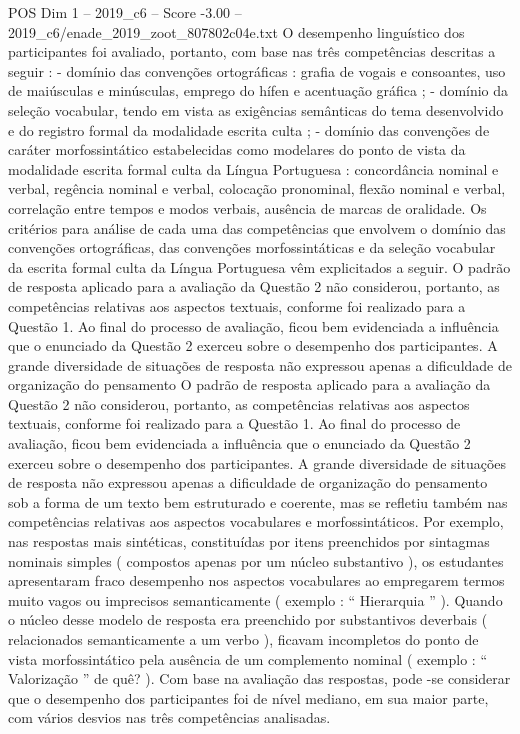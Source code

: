 \begin{textsample}{POS Dim 1 – 2019\_c6 – Score -3.00 – 2019\_c6/enade\_2019\_zoot\_807802c04e.txt}
O desempenho linguístico dos participantes foi avaliado, portanto, com base nas três competências descritas a seguir : - domínio das convenções ortográficas : grafia de vogais e consoantes, uso de maiúsculas e minúsculas, emprego do hífen e acentuação gráfica ; - domínio da seleção vocabular, tendo em vista as exigências semânticas do tema desenvolvido e do registro formal da modalidade escrita culta ; - domínio das convenções de caráter morfossintático estabelecidas como modelares do ponto de vista da modalidade escrita formal culta da Língua Portuguesa : concordância nominal e verbal, regência nominal e verbal, colocação pronominal, flexão nominal e verbal, correlação entre tempos e modos verbais, ausência de marcas de oralidade.
Os critérios para análise de cada uma das competências que envolvem o domínio das convenções ortográficas, das convenções morfossintáticas e da seleção vocabular da escrita formal culta da Língua Portuguesa vêm explicitados a seguir.
O padrão de resposta aplicado para a avaliação da Questão 2 não considerou, portanto, as competências relativas aos aspectos textuais, conforme foi realizado para a Questão 1.
Ao final do processo de avaliação, ficou bem evidenciada a influência que o enunciado da Questão 2 exerceu sobre o desempenho dos participantes.
A grande diversidade de situações de resposta não expressou apenas a dificuldade de organização do pensamento O padrão de resposta aplicado para a avaliação da Questão 2 não considerou, portanto, as competências relativas aos aspectos textuais, conforme foi realizado para a Questão 1.
Ao final do processo de avaliação, ficou bem evidenciada a influência que o enunciado da Questão 2 exerceu sobre o desempenho dos participantes.
A grande diversidade de situações de resposta não expressou apenas a dificuldade de organização do pensamento sob a forma de um texto bem estruturado e coerente, mas se refletiu também nas competências relativas aos aspectos vocabulares e morfossintáticos.
Por exemplo, nas respostas mais sintéticas, constituídas por itens preenchidos por sintagmas nominais simples ( compostos apenas por um núcleo substantivo ), os estudantes apresentaram fraco desempenho nos aspectos vocabulares ao empregarem termos muito vagos ou imprecisos semanticamente ( exemplo : “ Hierarquia ” ).
Quando o núcleo desse modelo de resposta era preenchido por substantivos deverbais ( relacionados semanticamente a um verbo ), ficavam incompletos do ponto de vista morfossintático pela ausência de um complemento nominal ( exemplo : “ Valorização ” de quê? ).
Com base na avaliação das respostas, pode -se considerar que o desempenho dos participantes foi de nível mediano, em sua maior parte, com vários desvios nas três competências analisadas.

\end{textsample}

